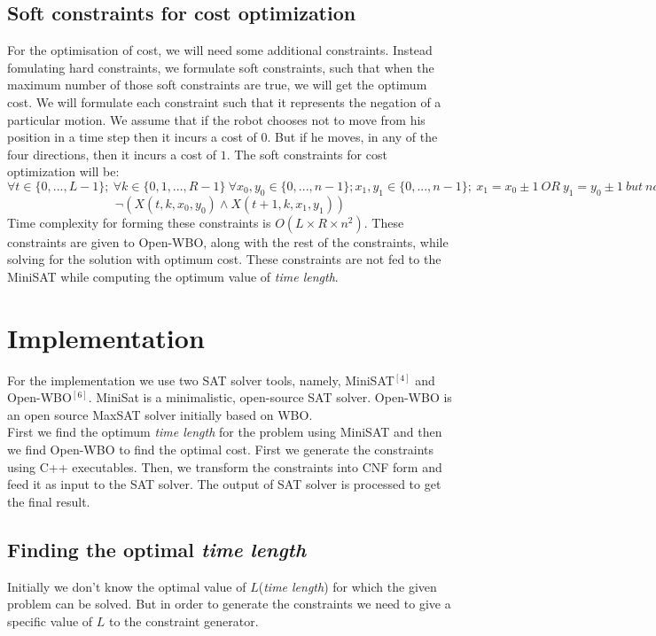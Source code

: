 \documentclass{article}[11pt]
\begin{document}
		\subsection{Soft constraints for cost optimization}
			For the optimisation of cost, we will need some additional constraints. Instead fomulating hard constraints, we formulate soft constraints, such that when the maximum number of those soft constraints are true, we will get the optimum cost.
			We will formulate each constraint such that it represents the negation of a particular motion. We assume that if the robot chooses not to move from his position in a time step then it incurs a cost of $0$. But if he moves, in any of the four directions, then it incurs a cost of $1$.
			The soft constraints for cost optimization will be:\\
			$\forall t \in \{0, ..., L-1\};\ \forall k \in \{0, 1, ..., R-1\}\ \forall x_0,y_0 \in \{0,...,n-1\};
			x_1, y_1 \in \{0,...,n-1\}; \ x_1=x_0 \pm 1 \ OR \ y_1=y_0 \pm 1 \ but \ not \ both; $
			$$
				\neg(X(t, k, x_0, y_0) \wedge X(t+1, k, x_1, y_1))
			$$
			Time complexity for forming these constraints is $O(L \times R \times n^2)$. These constraints are given to Open-WBO, along with the rest of the constraints, while solving for the solution with optimum cost. These constraints are not fed to the MiniSAT while computing the optimum value of \textit{time length}. 

	\section{Implementation}
		For the implementation we use two SAT solver tools, namely, MiniSAT$^[4]$ and Open-WBO$^[6]$. MiniSat is a minimalistic, open-source SAT solver. Open-WBO is an open source MaxSAT solver initially based on WBO.\\
		First we find the optimum \textit{time length} for the problem using MiniSAT and then we find Open-WBO to find the optimal cost.
		First we generate the constraints using C++ executables.
		Then, we transform the constraints into CNF form and feed it as input to the SAT solver.
		The output of SAT solver is processed to get the final result.
		
		\subsection{Finding the optimal \textit{time length}}
			Initially we don't know the optimal value of $L$(\textit{time length}) for which the given problem can be solved. But in order to generate the constraints we need to give a specific value of $L$ to the constraint generator.
\end{document}

